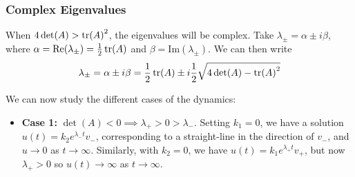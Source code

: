 \documentclass[12pt, oneside]{article}
\begin{document}
\subsubsection{Complex Eigenvalues}

When $4 \det (A) > \tr (A)^2$, the eigenvalues will be complex. Take $\lambda_\pm = \alpha \pm i \beta$, where $\alpha = \text{Re}(\lambda_\pm) = \frac{1}{2}\tr (A)$ and $\beta = \text{Im}(\lambda_\pm)$. We can then write \begin{align*}
  \lambda_\pm = \alpha \pm i \beta=\frac{1}{2}\tr (A) \pm i \frac{1}{2} \sqrt{4 \det (A) - \tr (A)^2}
\end{align*}

We can now study the different cases of the dynamics:
\begin{itemize}
  \item \textbf{Case 1:} $\det (A) < 0 \implies \lambda_+ > 0 > \lambda_-$. Setting $k_1 = 0$, we have a solution $u(t) = k_2 e^{\lambda_- t} v_-$, corresponding to a straight-line in the direction of $v_-$, and $u \to 0 $ as $t\to \infty$. Similarly, with $k_2 = 0$, we have $u(t) = k_1 e^{\lambda_+ t} v_+$, but now $\lambda_+ > 0$ so $u(t) \to \infty$ as $t \to \infty$.
\end{itemize}
\end{document}
